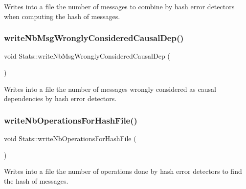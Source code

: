 Writes into a file the number of messages to combine by hash error detectors when computing the hash of messages. 

\mbox{\label{class_stats_a04ae8a18f5e0713f9275a3cf7b20d181}} 
\subsubsection{\texorpdfstring{write\+Nb\+Msg\+Wrongly\+Considered\+Causal\+Dep()}{writeNbMsgWronglyConsideredCausalDep()}}
{\footnotesize\ttfamily void Stats\+::write\+Nb\+Msg\+Wrongly\+Considered\+Causal\+Dep (\begin{DoxyParamCaption}{ }\end{DoxyParamCaption})\hspace{0.3cm}{\ttfamily [private]}}



Writes into a file the number of messages wrongly considered as causal dependencies by hash error detectors. 

\mbox{\label{class_stats_af07c3564deda3a19d1efe92108a20c19}} 
\subsubsection{\texorpdfstring{write\+Nb\+Operations\+For\+Hash\+File()}{writeNbOperationsForHashFile()}}
{\footnotesize\ttfamily void Stats\+::write\+Nb\+Operations\+For\+Hash\+File (\begin{DoxyParamCaption}{ }\end{DoxyParamCaption})\hspace{0.3cm}{\ttfamily [private]}}



Writes into a file the number of operations done by hash error detectors to find the hash of messages. 

\mbox{\label{class_stats_a5e7dc3debec2bdc35b11e713283ab0b3}} 
